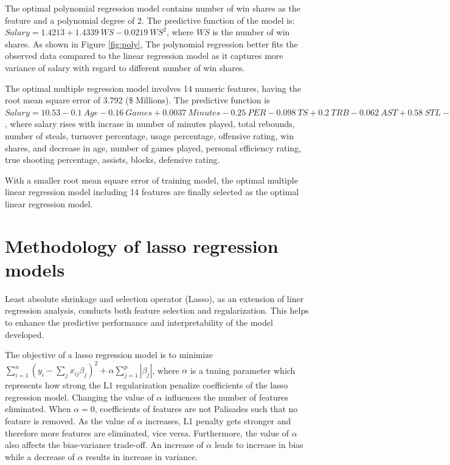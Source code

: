\documentclass[letterpaper,12pt,twoside,]{pinp}
\begin{document}
The optimal polynomial regression model contains number of win shares as
the feature and a polynomial degree of 2. The predictive function of the
model is: \(Salary=1.4213+1.4339~WS-0.0219~WS^2\), where \(WS\) is the
number of win shares. As shown in Figure \ref{fig:poly}, The polynomial
regression better fits the observed data compared to the linear
regression model as it captures more variance of salary with regard to
different number of win shares.

The optimal multiple regression model involves 14 numeric features,
having the root mean square error of 3.792 (\$ Millions). The predictive
function is
\(Salary = 10.53-0.1~Age-0.16~Games+0.0037~Minutes-0.25~PER-0.098~TS+0.2~TRB-0.062~AST+0.58~STL-0.21~BLK+0.12~TOV+0.51~USG+0.11~ORtg-0.19～DRtg+0.49~WS\),
where salary rises with incrase in number of minutes played, total
rebounds, number of steals, turnover percentage, usage percentage,
offensive rating, win shares, and decrease in age, number of games
played, personal efficiency rating, true shooting percentage, assists,
blocks, defensive rating.

With a smaller root mean square error of training model, the optimal
multiple linear regression model including 14 features are finally
selected as the optimal linear regression model.

\hypertarget{methodology-of-lasso-regression-models}{%
\section{Methodology of lasso regression
models}\label{methodology-of-lasso-regression-models}}

Least absolute shrinkage and selection operator (Lasso), as an extension
of liner regression analysis, conducts both feature selection and
regularization. This helps to enhance the predictive performance and
interpretability of the model developed.

The objective of a lasso regression model is to minimize
\(\sum^n_{i=1}(y_i-\sum_jx_{ij}\beta_j)^2+\alpha\sum^p_{j=1}|\beta_j|\),
where \(\alpha\) is a tuning parameter which represents how strong the
L1 regularization penalize coefficients of the lasso regression model.
Changing the value of \(\alpha\) influences the number of features
eliminated. When \(\alpha=0\), coefficients of features are not
Palisades such that no feature is removed. As the value of \(\alpha\)
increases, L1 penalty gets stronger and therefore more features are
eliminated, vice versa. Furthermore, the value of \(\alpha\) also
affects the bias-variance trade-off. An increase of \(\alpha\) leads to
increase in bias while a decrease of \(\alpha\) results in increase in
variance.
\end{document}
